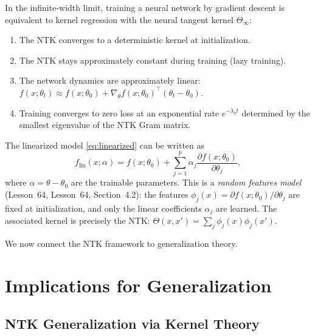 \documentclass[11pt,a4paper]{article}
\begin{document}
\begin{keyresult}[title={NTK Theory: Training = Kernel Regression}]
In the infinite-width limit, training a neural network by gradient
descent is equivalent to kernel regression with the neural tangent
kernel $\Theta_\infty$:
\begin{enumerate}[nosep]
  \item The NTK converges to a deterministic kernel at initialization.
  \item The NTK stays approximately constant during training (lazy
    training).
  \item The network dynamics are approximately linear: $f(x; \theta_t)
    \approx f(x; \theta_0) + \nabla_\theta f(x; \theta_0)^\top
    (\theta_t - \theta_0)$.
  \item Training converges to zero loss at an exponential rate
    $e^{-\lambda_0 t}$ determined by the smallest eigenvalue of the
    NTK Gram matrix.
\end{enumerate}
\end{keyresult}

\begin{example}
\label{ex:linearized-rf}
The linearized model \eqref{eq:linearized} can be written as
\[
  f_{\text{lin}}(x; \alpha) = f(x; \theta_0) +
  \sum_{j=1}^{p} \alpha_j \frac{\partial f(x; \theta_0)}
  {\partial \theta_j},
\]
where $\alpha = \theta - \theta_0$ are the trainable parameters.
This is a \emph{random features model} (Lesson~64,
Lesson~64, Section~4.2): the features
$\phi_j(x) = \partial f(x; \theta_0) / \partial \theta_j$ are
fixed at initialization, and only the linear coefficients $\alpha_j$
are learned.  The associated kernel is precisely the NTK:
$\Theta(x, x') = \sum_j \phi_j(x) \phi_j(x')$.
\end{example}

We now connect the NTK framework to generalization theory.

\section{Implications for Generalization}
\label{sec:generalization}

\subsection{NTK Generalization via Kernel Theory}
\end{document}
